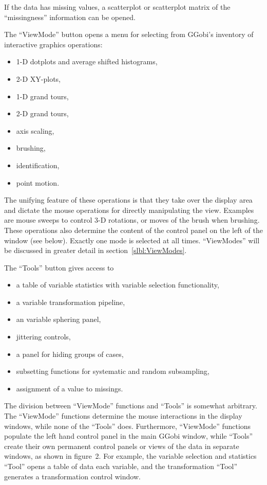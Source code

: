 \documentclass[11pt]{article}
\begin{document}
If the data has missing values, a scatterplot or scatterplot matrix
of the ``missingness'' information can be opened.

The ``ViewMode'' button opens a menu for selecting from GGobi's
inventory of interactive graphics operations: 
\begin{itemize}
\itemsep 0em
\item 1-D dotplots and average shifted histograms,
\item 2-D XY-plots, 
\item 1-D grand tours,
\item 2-D grand tours,
\item axis scaling, 
\item brushing, 
\item identification, 
\item point motion.  
\end{itemize}

The unifying feature of these operations is that they take over the
display area and dictate the mouse operations for directly
manipulating the view.  Examples are mouse sweeps to control 3-D
rotations, or moves of the brush when brushing.  These operations
also determine the content of the control panel on the left of the
window (see below).  Exactly one mode is selected at all times.
``ViewModes'' will be discussed in greater detail in
section~\ref{slbl:ViewModes}.

The ``Tools'' button gives access to 
\begin{itemize}
\itemsep 0em
\item a table of variable statistics with variable selection functionality,
\item a variable transformation pipeline,
\item an variable sphering panel,
\item jittering controls,
\item a panel for hiding groups of cases,
\item subsetting functions for systematic and random subsampling, 
\item assignment of a value to missings.

\end{itemize}
The division between ``ViewMode'' functions and ``Tools'' is somewhat
arbitrary.  The ``ViewMode'' functions determine the mouse
interactions in the display windows, while none of the ``Tools''
does.  Furthermore, ``ViewMode'' functions populate the left hand
control panel in the main GGobi window, while ``Tools'' create their
own permanent control panels or views of the data in separate
windows, as shown in figure~2.  For example, the variable selection
and statistics ``Tool'' opens a table of data each variable, and the
transformation ``Tool'' generates a transformation control window.
\end{document}
